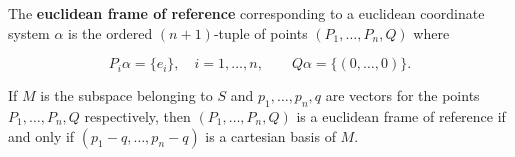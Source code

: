 The \textbf{euclidean frame of reference} corresponding to a euclidean coordinate system $\alpha$ is the ordered $(n+1)$-tuple of points $(P_1, \ldots, P_n, Q)$ where

$$P_i\alpha = \{e_i\}, \quad i = 1, \ldots, n, \qquad Q\alpha = \{(0, \ldots, 0)\}.$$

If $M$ is the subspace belonging to $S$ and $p_1, \ldots, p_n, q$ are vectors for the points $P_1, \ldots, P_n, Q$ respectively, then $(P_1, \ldots, P_n, Q)$ is a euclidean frame of reference if and only if $(p_1 - q, \ldots, p_n - q)$ is a cartesian basis of $M$.
